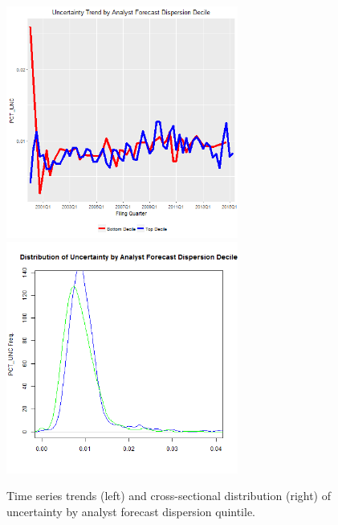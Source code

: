 \begin{figure}[H] 
\centering
\includegraphics[width=3in, height=3in]{figures/punc-by-dispersion-ts}
\includegraphics[width=3in, height=3in]{figures/punc-by-dispersion-xs}
\captionsetup{justification=centering, width=.95\textwidth} 
\caption{\footnotesize Time series trends (left) and cross-sectional distribution (right) of uncertainty by analyst forecast dispersion quintile.} \label{bunc-disp}
\end{figure} 
\newpage
